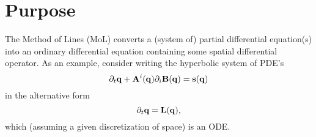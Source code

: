 









\section{Purpose}
\label{CactusBase_MoL_sec:purpose}

The Method of Lines (MoL) converts a (system of) partial differential
equation(s) into an ordinary differential equation containing some
spatial differential operator. As an example, consider writing the
hyperbolic system of PDE's
\begin{equation}
  \label{CactusBase_MoL_eq:mol1}
  \partial_t {\bf q} + {\bf A}^i({\bf q}) \partial_i {\bf B}({\bf q})
  = {\bf s}({\bf q})
\end{equation}
in the alternative form
\begin{equation}
  \label{CactusBase_MoL_eq:mol2}
  \partial_t {\bf q} = {\bf L}({\bf q}),
\end{equation}
which (assuming a given discretization of space) is an ODE.

